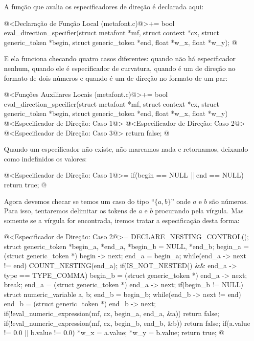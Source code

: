 {A função que avalia os especificadores de direção é declarada aqui:

\iniciocodigo
@<Declaração de Função Local (metafont.c)@>+=
bool eval_direction_specifier(struct metafont *mf, struct context *cx,
                              struct generic_token *begin,
                              struct generic_token *end, float *w_x,
                              float *w_y);
@
\fimcodigo

E ela funciona checando quatro casos diferentes: quando não há
especificador nenhum, quando ele é especificador de curvatura, quando
é um de direção no formato de dois números e quando é um de direção no
formato de um par:

\iniciocodigo
@<Funções Auxiliares Locais (metafont.c)@>+=
bool eval_direction_specifier(struct metafont *mf, struct context *cx,
                              struct generic_token *begin,
                              struct generic_token *end, float *w_x,
                              float *w_y){
  @<Especificador de Direção: Caso 1@>
  @<Especificador de Direção: Caso 2@>
  @<Especificador de Direção: Caso 3@>
  return false;
}
@
\fimcodigo

Quando um especificador não existe, não marcamos nada e retornamos,
deixando como indefinidos os valores:

\iniciocodigo
@<Especificador de Direção: Caso 1@>=
if(begin == NULL || end == NULL){
  return true;
}
@
\fimcodigo

Agora devemos checar se temos um caso do tipo ``$\{ a , b\}$'' onde
$a$ e $b$ são números. Para isso, tentaremos delimitar os tokens de
$a$ e $b$ procurando pela vírgula. Mas somente se a vírgula for
encontrada, iremos tratar a especificação desta forma:

\iniciocodigo
@<Especificador de Direção: Caso 2@>=
DECLARE_NESTING_CONTROL();
struct generic_token *begin_a, *end_a, *begin_b = NULL, *end_b;
begin_a = (struct generic_token *) begin -> next;
end_a = begin_a;
while(end_a -> next != end){
  COUNT_NESTING(end_a);
  if(IS_NOT_NESTED() && end_a -> type == TYPE_COMMA){
    begin_b = (struct generic_token *) end_a -> next;
    break;
  }
  end_a = (struct generic_token *) end_a -> next;
}
if(begin_b != NULL){
  struct numeric_variable a, b;
  end_b = begin_b;
  while(end_b -> next != end)
    end_b = (struct generic_token *) end_b -> next;
  if(!eval_numeric_expression(mf, cx, begin_a, end_a, &a))
    return false;
  if(!eval_numeric_expression(mf, cx, begin_b, end_b, &b))
    return false;
  if(a.value != 0.0 || b.value != 0.0){
    *w_x = a.value;
    *w_y = b.value;
  }
  return true;
}
@
\fimcodigo

}
